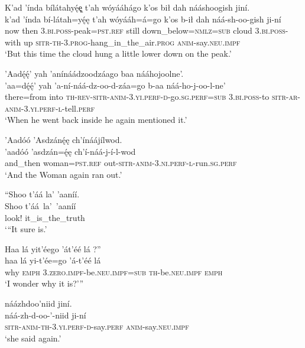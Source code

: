 \ea\label{ex:text5-3-4}
K’ad ’índa bílátahyę́ę̨ t’ah wóyááhágo k’os bił dah nááshoogish jiní.\\
\gll k’ad	’índa	bí-látah=yę́ę	t’ah	wóyááh=á=go	k’os	b-ił	dah	náá-sh-oo-gish	ji-ní\\
     now	then	3.\textsc{bi}.\textsc{poss}-peak=\textsc{pst}.\textsc{ref}	still	down\_below=\textsc{nmlz}=\textsc{sub}	cloud	3.\textsc{bi}.\textsc{poss}-with	up	\textsc{sitr}-\textsc{th}-3.\textsc{prog}-hang\_in\_the\_air.\textsc{prog}	\textsc{anim}-say.\textsc{neu}.\textsc{impf}\\
\glt `But this time the cloud hung a little lower down on the peak.'
\z

\ea\label{ex:text5-3-5}
’Aadę́ę́’ yah ’anínáádzoodzáago baa nááhojoolne’.\\
\gll ’aa=dę́ę́’	yah	’a-ní-náá-dz-oo-d-záa=go	b-aa	náá-ho-j-oo-l-ne’\\
     there=from	into	\textsc{th}-\textsc{rev}-\textsc{sitr}-\textsc{anim}-3.\textsc{yi}.\textsc{perf}-\textsc{d}-go.\textsc{sg}.\textsc{perf}=\textsc{sub}	3.\textsc{bi}.\textsc{poss}-to	\textsc{sitr}-\textsc{ar}-\textsc{anim}-3.\textsc{yi}.\textsc{perf}-\textsc{l}-tell.\textsc{perf}\\
\glt `When he went back inside he again mentioned it.'
\z

\ea\label{ex:text5-3-6}
’Aadóó ’Asdzánę́ę ch’ínáájílwod.\\
\gll ’aadóó	’asdzán=ę́ę	ch’í-náá-j-í-l-wod\\
     and\_then	woman=\textsc{pst}.\textsc{ref}	out-\textsc{sitr}-\textsc{anim}-3.\textsc{ni}.\textsc{perf}-\textsc{l}-run.\textsc{sg}.\textsc{perf}\\
\glt `And the Woman again ran out.'
\z

\newpage
\ea\label{ex:text5-3-7}
``Shoo t’áá la’ ’aaníí.\\
\gll Shoo	t’áá~la’~’aaníí\\
     look!	it\_is\_the\_truth\\
\glt `“It sure is.'
\z

\ea\label{ex:text5-3-8}
Haa lá yit’éego ’át’éé lá ?''\\
\gll haa	lá	yi-t’ée=go	’á-t’éé	lá\\
     why	\textsc{emph}	3.\textsc{zero}.\textsc{impf}-be.\textsc{neu}.\textsc{impf}=\textsc{sub}	\textsc{th}-be.\textsc{neu}.\textsc{impf}	\textsc{emph}\\
\glt `I wonder why it is?'''
\z

\ea\label{ex:text5-3-9}
náázhdoo’niid jiní.\\
\gll náá-zh-d-oo-’-niid	ji-ní\\
     \textsc{sitr}-\textsc{anim}-\textsc{th}-3.\textsc{yi}.\textsc{perf}-\textsc{d}-say.\textsc{perf}	\textsc{anim}-say.\textsc{neu}.\textsc{impf}\\
\glt `she said again.'
\z

